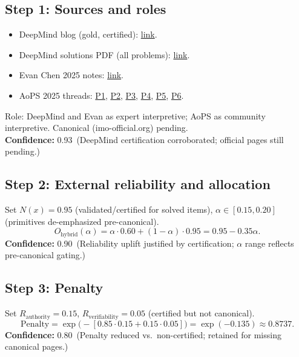 \documentclass[11pt]{article}
\newcommand{\Nx}{N(x)}
\newcommand{\pen}{\mathrm{Penalty}}
\newcommand{\conf}[2]{\textbf{Confidence:} #1\ (#2)}
\begin{document}
\subsection*{Step 1: Sources and roles}
\begin{itemize}[leftmargin=1.35em]
  \item DeepMind blog (gold, certified): \href{https://deepmind.google/discover/blog/advanced-version-of-gemini-with-deep-think-officially-achieves-gold-medal-standard-at-the-international-mathematical-olympiad/}{link}.
  \item DeepMind solutions PDF (all problems): \href{https://storage.googleapis.com/deepmind-media/gemini/IMO_2025.pdf}{link}.
  \item Evan Chen 2025 notes: \href{https://web.evanchen.cc/exams/IMO-2025-notes.pdf}{link}.
  \item AoPS 2025 threads: \href{https://aops.com/community/p35332003}{P1}, \href{https://aops.com/community/p35332018}{P2}, \href{https://aops.com/community/p35332016}{P3}, \href{https://aops.com/community/p35347364}{P4}, \href{https://aops.com/community/p35341177}{P5}, \href{https://aops.com/community/p35341197}{P6}.
\end{itemize}
Role: DeepMind and Evan as expert interpretive; AoPS as community interpretive. Canonical (imo-official.org) pending.\\
\conf{0.93}{DeepMind certification corroborated; official pages still pending.}

\subsection*{Step 2: External reliability and allocation}
Set $\Nx=0.95$ (validated/certified for solved items), $\alpha\in[0.15,0.20]$ (primitives de-emphasized pre-canonical).
\[
O_{\text{hybrid}}(\alpha)=\alpha\cdot 0.60 + (1-\alpha)\cdot 0.95 = 0.95-0.35\alpha.
\]
\conf{0.90}{Reliability uplift justified by certification; $\alpha$ range reflects pre-canonical gating.}

\subsection*{Step 3: Penalty}
Set $R_{\text{authority}}=0.15$, $R_{\text{verifiability}}=0.05$ (certified but not canonical).
\[
\pen = \exp\!\bigl(-[0.85\cdot 0.15 + 0.15\cdot 0.05]\bigr)=\exp(-0.135)\approx 0.8737.
\]
\conf{0.80}{Penalty reduced vs.\ non-certified; retained for missing canonical pages.}
\end{document}
